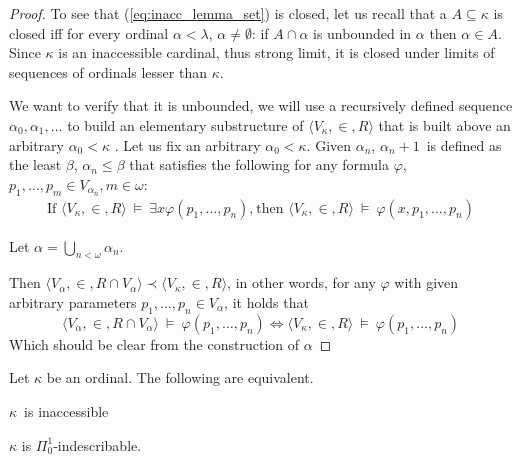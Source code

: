 \begin{proof}
To see that (\ref{eq:inacc_lemma_set}) is closed, let us recall that a $A \subseteq \kappa$ is closed iff for every ordinal $\alpha < \lambda$, $\alpha \neq \emptyset$: if $A \cap \alpha$ is unbounded in $\alpha$ then $\alpha \in A$. Since $\kappa$ is an inaccessible cardinal, thus strong limit, it is closed under limits of sequences of ordinals lesser than $\kappa$.  


We want to verify that it is unbounded, we will use a recursively defined sequence $\alpha_0, \alpha_1, \ldots$
to build an elementary substructure of $\langle V_\kappa, \in, R \rangle$ that is built above an arbitrary $\alpha_0 <\kappa$ .
Let us fix an arbitrary $\alpha_0 < \kappa$. Given $\alpha_n$, $\alpha_n+1$ is defined as the least $\beta$, $\alpha_n \leq \beta$ that satisfies 
the following for any formula $\varphi$, $p_1, \ldots, p_m \in V_{\alpha_{n}}, m \in \omega$:
\begin{equation}
\begin{gathered}
\mbox{If }\langle V_\kappa, \in, R \rangle~\models~\exists x \varphi(p_1, \ldots, p_n)\mbox{,}\
\mbox{then }\langle V_\kappa, \in, R \rangle~\models~\varphi(x, p_1, \ldots, p_n)
\end{gathered}
\end{equation}

Let $\alpha = \bigcup_{n < \omega} \alpha_n$. 

Then $\langle V_\alpha, \in, R \cap V_\alpha \rangle \prec \langle V_\kappa, \in, R \rangle$, in other words, for any $\varphi$ with given arbitrary parameters $p_1, \ldots, p_n \in V_\alpha$, it holds that
\begin{equation}
\langle V_\alpha, \in, R \cap V_\alpha \rangle~\models~\varphi(p_1, \ldots, p_n) \iff \langle V_\kappa, \in, R \rangle~\models~\varphi(p_1, \ldots, p_n)
\end{equation}
Which should be clear from the construction of $\alpha$
\end{proof}

\begin{theorem}
Let $\kappa$ be an ordinal. The following are equivalent.
\bce[(i)]
\item $\kappa$ is inaccessible
\item $\kappa$ is $\Pi^1_0$-indescribable.
\ece
\end{theorem}

